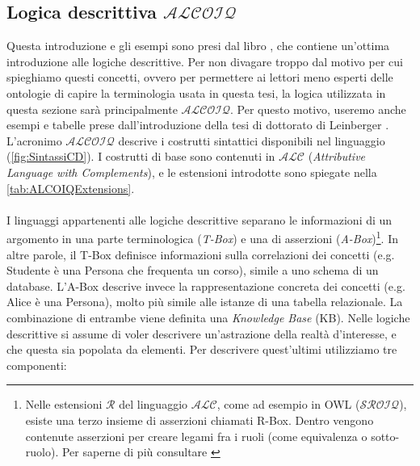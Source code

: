 \subsection[Logica  descrittiva $\mathcal{ALCOIQ}$]{Logica  descrittiva $\mathcal{ALCOIQ}$}
Questa introduzione e gli esempi sono presi dal libro \cite{baader2017introductionDL}, che contiene un'ottima introduzione alle logiche descrittive. Per non divagare troppo dal motivo per cui spieghiamo questi concetti, ovvero per permettere ai lettori meno esperti delle ontologie di capire la terminologia usata in questa tesi, la logica utilizzata in questa sezione sarà principalmente $\mathcal{ALCOIQ}$. Per questo motivo, useremo anche esempi e tabelle prese dall'introduzione della tesi di dottorato di Leinberger \cite{leinbergerphdthesis}. L'acronimo $\mathcal{ALCOIQ}$ descrive i costrutti sintattici disponibili nel linguaggio (\autoref{fig:SintassiCD}). I costrutti di base sono contenuti in $\mathcal{ALC}$ (\textit{Attributive Language with Complements}), e le estensioni introdotte sono spiegate nella \autoref{tab:ALCOIQExtensions}. \\\\
I linguaggi appartenenti alle logiche descrittive separano le informazioni di un argomento in una parte terminologica (\textit{T-Box}) e una di asserzioni (\textit{A-Box})\footnote{ Nelle estensioni $\mathcal{R}$ del linguaggio $\mathcal{ALC}$, come ad esempio in OWL ($\mathcal{SROIQ}$), esiste una terzo insieme di asserzioni chiamati R-Box. Dentro vengono contenute asserzioni per creare legami fra i ruoli (come equivalenza o sotto-ruolo). Per saperne di più consultare \cite{baader2017introductionDL}}. In altre parole, il T-Box definisce informazioni sulla correlazioni dei concetti (e.g. Studente è una Persona che frequenta un corso), simile a uno schema di un database. L’A-Box descrive invece la rappresentazione concreta dei concetti (e.g. Alice è una Persona), molto più simile alle istanze di una tabella relazionale. La combinazione di entrambe viene definita una \textit{Knowledge Base} (KB).
Nelle logiche descrittive si assume di voler descrivere un’astrazione della realtà d’interesse, e che questa sia popolata da elementi. Per descrivere quest'ultimi utilizziamo tre componenti:
